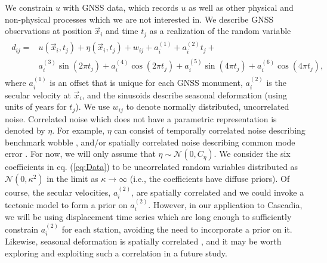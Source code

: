 \documentclass[10pt,letter]{article}
\begin{document}
We constrain $u$ with GNSS data, which records $u$ as well as other physical and non-physical processes which we are not interested in. We describe GNSS observations at position $\vec{x}_i$ and time $t_j$ as a realization of the random variable 
\begin{align}\label{eq:Data}
\begin{split}
d_{ij} = &u(\vec{x}_i,t_j) + \eta(\vec{x}_i,t_j) + w_{ij} + a^{(1)}_i + a^{(2)}_it_j + \\
         &a^{(3)}_i\sin(2 \pi t_j) + a^{(4)}_i\cos(2 \pi t_j) + a^{(5)}_i\sin(4 \pi t_j) + a^{(6)}_i\cos(4 \pi t_j), 
\end{split}
\end{align}
where $a^{(1)}_{i}$ is an offset that is unique for each GNSS monument, $a^{(2)}_{i}$ is the secular velocity at $\vec{x}_i$, and the sinusoids describe seasonal deformation (using units of years for $t_j$). We use $w_{ij}$ to denote normally distributed, uncorrelated noise. Correlated noise which does not have a parametric representation is denoted by $\eta$.  For example, $\eta$ can consist of temporally correlated noise describing benchmark wobble \citep[e.g.,][]{Wyatt1982,Wyatt1989}, and/or spatially correlated noise describing common mode error \citep[e.g.,][]{Wdowinski1997}. For now, we will only assume that $\eta \sim \mathcal{N}(0,C_\eta)$. We consider the six coefficients in eq. (\ref{eq:Data}) to be uncorrelated random variables distributed as $\mathcal{N}(0,\kappa^2)$ in the limit as $\kappa \to \infty$ (i.e., the coefficients have diffuse priors). Of course, the secular velocities, $a^{(2)}_{i}$, are spatially correlated and we could invoke a tectonic model to form a prior on $a^{(2)}_{i}$. However, in our application to Cascadia, we will be using displacement time series which are long enough to sufficiently constrain $a^{(2)}_{i}$ for each station, avoiding the need to incorporate a prior on it. Likewise, seasonal deformation is spatially correlated \citep{Dong2002,Langbein2008}, and it may be worth exploring and exploiting such a correlation in a future study. 
\end{document}

